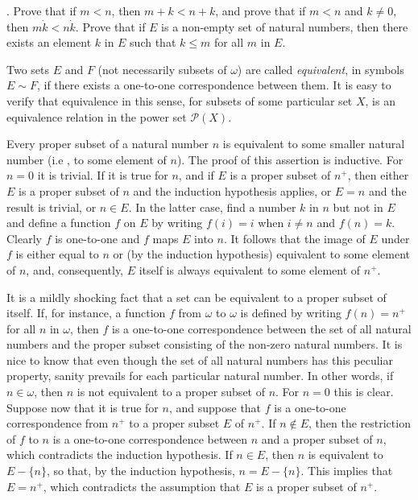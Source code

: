 \begin{exercise}. Prove that if $m < n$, then $m + k < n + k$, and prove that if $m < n$ and $k \neq 0$, then $m \dot k <n \dot k$. Prove that if $E$ is a non-empty set of natural numbers, then there exists an element $k$ in $E$ such that $k \le m$ for all $m$ in $E$. 
\end{exercise}

Two sets $E$ and $F$ (not necessarily subsets of $\omega$) are called \textit{equivalent}, in symbols $E \sim F$, if there exists a one-to-one correspondence between them. It is easy to verify that equivalence in this sense, for subsets of some particular set $X$, is an equivalence relation in the power set $\mathcal{P}(X)$.

Every proper subset of a natural number $n$ is equivalent to some smaller natural number (i.e , to some element of $n$). The proof of this assertion is inductive. For $n = 0$ it is trivial. If it is true for $n$, and if $E$ is a proper subset of $n^{+}$, then either $E$ is a proper subset of $n$ and the induction hypothesis applies, or $E = n$ and the result is trivial, or $n \in E$. In the latter case, find a number $k$ in $n$ but not in $E$ and define a function $f$ on $E$ by writing $f(i) = i$ when $i \neq n$ and $f(n) = k$. Clearly $f$ is one-to-one and $f$ maps $E$ into $n$. It follows that the image of $E$ under $f$ is either equal to $n$ or (by the induction hypothesis) equivalent to some element of $n$, and, consequently, $E$ itself is always equivalent to some element of $n^{+}$. 

It is a mildly shocking fact that a set can be equivalent to a proper subset of itself. If, for instance, a function $f$ from $\omega$ to $\omega$ is defined by writing $f(n) = n^{+}$ for all $n$ in $\omega$, then $f$ is a one-to-one correspondence between the set of all natural numbers and the proper subset consisting of the non-zero natural numbers. It is nice to know that even though the set of all natural numbers has this peculiar property, sanity prevails for each particular natural number. In other words, if $n \in \omega$, then $n$ is not equivalent to a proper subset of $n$. For $n = 0$ this is clear. Suppose now that it is true for $n$, and suppose that $f$ is a one-to-one correspondence from $n^{+}$ to a proper subset $E$ of $n^{+}$. If $n \notin E$, then the restriction of $f$ to $n$ is a one-to-one correspondence between $n$ and a proper subset of $n$, which contradicts the induction hypothesis. If $n \in E$, then $n$ is equivalent to $E - \{ n \}$, so that, by the induction hypothesis, $n = E - \{ n \}$. This implies that $E = n^{+}$, which contradicts the assumption that $E$ is a proper subset of $n^{+}$. 


